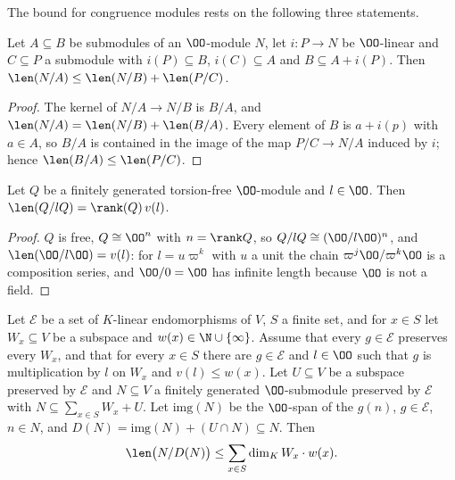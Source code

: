The bound for congruence modules rests on the following three statements.

\begin{lemma}\label{pf:linkN:split}
Let $A\subseteq B$ be submodules of an $\OO$-module $N$, let $i:P\to N$ be $\OO$-linear and $C\subseteq P$ a submodule with $i(P)\subseteq B$,
$i(C)\subseteq A$ and $B\subseteq A+i(P)$. Then $\len(N/A)\le\len(N/B)+\len(P/C)$.
\end{lemma}

\begin{proof}
The kernel of $N/A\to N/B$ is $B/A$, and $\len(N/A)=\len(N/B)+\len(B/A)$. Every element of $B$ is $a+i(p)$ with $a\in A$, so $B/A$ is
contained in the image of the map $P/C\to N/A$ induced by $i$; hence $\len(B/A)\le\len(P/C)$.
\end{proof}

\begin{lemma}\label{pf:linkN:freequot}
Let $Q$ be a finitely generated torsion-free $\OO$-module and $l\in\OO$. Then $\len(Q/lQ)=\rank(Q)\,v(l)$.
\end{lemma}

\begin{proof}
$Q$ is free, $Q\cong\OO^n$ with $n=\rank Q$, so $Q/lQ\cong(\OO/l\OO)^n$, and $\len(\OO/l\OO)=v(l)$: for $l=u\varpi^k$ with $u$ a unit
the chain $\varpi^j\OO/\varpi^k\OO$ is a composition series, and $\OO/0=\OO$ has infinite length because $\OO$ is not a field.
\end{proof}

\begin{lemma}\label{pf:linkN:core}
Let $\mathcal E$ be a set of $K$-linear endomorphisms of $V$, $S$ a finite set, and for $x\in S$ let $W_x\subseteq V$ be a subspace and
$w(x)\in\N\cup\{\infty\}$. Assume that every $g\in\mathcal E$ preserves every $W_x$, and that for every $x\in S$ there are $g\in\mathcal E$
and $l\in\OO$ such that $g$ is multiplication by $l$ on $W_x$ and $v(l)\le w(x)$. Let $U\subseteq V$ be a subspace preserved by $\mathcal E$
and $N\subseteq V$ a finitely generated $\OO$-submodule preserved by $\mathcal E$ with $N\subseteq\sum_{x\in S}W_x+U$. Let $\mathrm{img}(N)$ be
the $\OO$-span of the $g(n)$, $g\in\mathcal E$, $n\in N$, and $D(N)=\mathrm{img}(N)+(U\cap N)\subseteq N$. Then
\[
\len\bigl(N/D(N)\bigr)\le\sum_{x\in S}\dim_KW_x\cdot w(x).
\]
\end{lemma}

